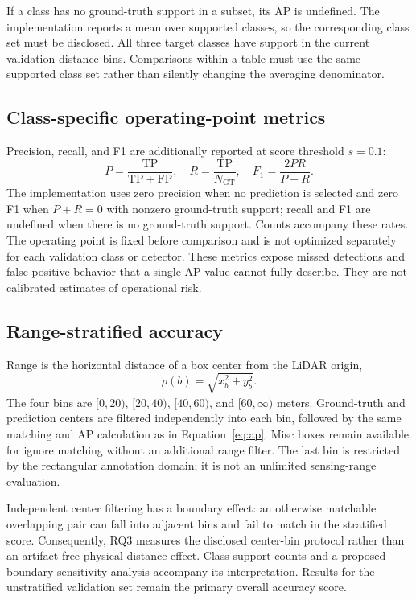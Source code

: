 \documentclass[10pt,twocolumn]{article}
\begin{document}
If a class has no ground-truth support in a subset, its AP is undefined. The implementation reports a mean over supported classes, so the corresponding class set must be disclosed. All three target classes have support in the current validation distance bins. Comparisons within a table must use the same supported class set rather than silently changing the averaging denominator.

\subsection{Class-specific operating-point metrics}
Precision, recall, and F1 are additionally reported at score threshold $s=0.1$:
\begin{equation}
P=\frac{\mathrm{TP}}{\mathrm{TP}+\mathrm{FP}},\quad R=\frac{\mathrm{TP}}{N_{\mathrm{GT}}},\quad F_1=\frac{2PR}{P+R}.
\end{equation}
The implementation uses zero precision when no prediction is selected and zero F1 when $P+R=0$ with nonzero ground-truth support; recall and F1 are undefined when there is no ground-truth support. Counts accompany these rates. The operating point is fixed before comparison and is not optimized separately for each validation class or detector. These metrics expose missed detections and false-positive behavior that a single AP value cannot fully describe. They are not calibrated estimates of operational risk.

\subsection{Range-stratified accuracy}
Range is the horizontal distance of a box center from the LiDAR origin,
\begin{equation}
\rho(b)=\sqrt{x_b^2+y_b^2}.
\end{equation}
The four bins are $[0,20)$, $[20,40)$, $[40,60)$, and $[60,\infty)$ meters. Ground-truth and prediction centers are filtered independently into each bin, followed by the same matching and AP calculation as in Equation~\ref{eq:ap}. Misc boxes remain available for ignore matching without an additional range filter. The last bin is restricted by the rectangular annotation domain; it is not an unlimited sensing-range evaluation.

Independent center filtering has a boundary effect: an otherwise matchable overlapping pair can fall into adjacent bins and fail to match in the stratified score. Consequently, RQ3 measures the disclosed center-bin protocol rather than an artifact-free physical distance effect. Class support counts and a proposed boundary sensitivity analysis accompany its interpretation. Results for the unstratified validation set remain the primary overall accuracy score.
\end{document}
